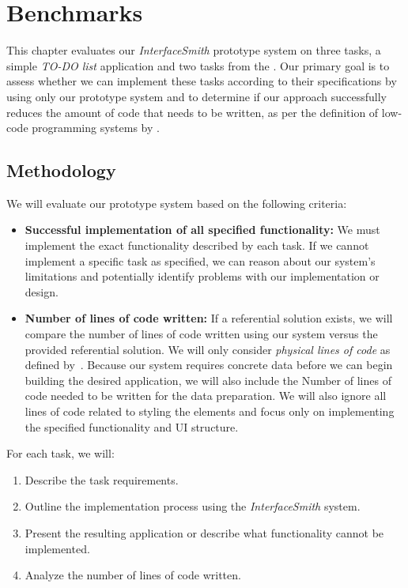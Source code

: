 \chapter{Benchmarks}
\label{chap:walktrough}

This chapter evaluates our \emph{InterfaceSmith} prototype system on three tasks, a simple \emph{TO-DO list} application and two tasks from the \citet{7GUIs-web}.
Our primary goal is to assess whether we can implement these tasks according to their
specifications by using only our prototype system and to determine if our approach successfully
reduces the amount of code that needs to be written,
as per the definition of low-code programming systems by \citet{Pinho_Aguiar_Amaral_2023}.

\section{Methodology}
We will evaluate our prototype system based on the following criteria:
\begin{itemize}
	\item \textbf{Successful implementation of all specified functionality:}
	      We must implement the exact functionality described by each task.
	      If we cannot implement a specific task as specified, we can reason about our system's limitations and potentially
	      identify problems with our implementation or design.

	\item \textbf{Number of lines of code written:}
	      If a referential solution exists, we will compare the number of lines of code written using our system versus the provided referential solution.
	      We will only consider \emph{physical lines of code} as defined by~\citet{Park_1992}.
	      Because our system requires concrete data before we can begin building the desired application, we will also include the Number of lines of code needed to be written for the data preparation.
	      We will also ignore all lines of code related to styling the elements and focus only on implementing the specified functionality and UI structure.
\end{itemize}

For each task, we will:
\begin{enumerate}
	\item Describe the task requirements.
	\item Outline the implementation process using the \emph{InterfaceSmith} system.
	\item Present the resulting application or describe what functionality cannot be implemented.
	\item Analyze the number of lines of code written.
\end{enumerate}

